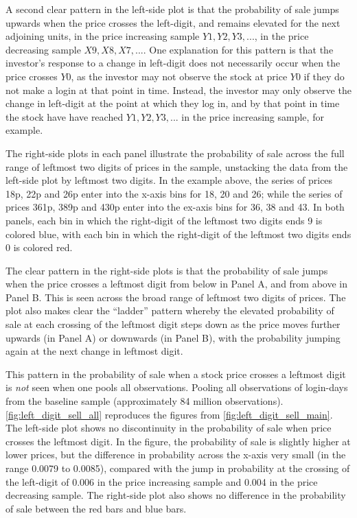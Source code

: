 A second clear pattern in the left-side plot is that the probability of sale jumps upwards when the price crosses the left-digit, and remains elevated for the next adjoining units, in the price increasing sample $Y1, Y2, Y3, ...$, in the price decreasing sample $X9, X8, X7,...$. One explanation for this pattern is that the investor's response to a change in left-digit does not necessarily occur when the price crosses $Y0$, as the investor may not observe the stock at price $Y0$ if they do not make a login at that point in time. Instead, the investor may only observe the change in left-digit at the point at which they log in, and by that point in time the stock have have reached $Y1, Y2, Y3,...$ in the price increasing sample, for example.

The right-side plots in each panel illustrate the probability of sale across the full range of leftmost two digits of prices in the sample, unstacking the data from the left-side plot by leftmost two digits. In the example above, the series of prices 18p, 22p and 26p enter into the x-axis bins for 18, 20 and 26; while the series of prices 361p, 389p and 430p enter into the ex-axis bins for 36, 38 and 43. In both panels, each bin in which the right-digit of the leftmost two digits ends 9 is colored blue, with each bin in which the right-digit of the leftmost two digits ends 0 is colored red.

The clear pattern in the right-side plots is that the probability of sale jumps when the price crosses a leftmost digit from below in Panel A, and from above in Panel B. This is seen across the broad range of leftmost two digits of prices. The plot also makes clear the ``ladder'' pattern whereby the elevated probability of sale at each crossing of the leftmost digit steps down as the price moves further upwards (in Panel A) or downwards (in Panel B), with the probability jumping again at the next change in leftmost digit.

This pattern in the probability of sale when a stock price crosses a leftmost digit is \textit{not} seen when one pools all observations. Pooling all observations of login-days from the baseline sample (approximately 84 million observations). \ref{fig:left_digit_sell_all} reproduces the figures from \ref{fig:left_digit_sell_main}. The left-side plot shows no discontinuity in the probability of sale when price crosses the leftmost digit. In the figure, the probability of sale is slightly higher at lower prices, but the difference in probability across the x-axis very small (in the range 0.0079 to 0.0085), compared with the jump in probability at the crossing of the left-digit of 0.006 in the price increasing sample and 0.004 in the price decreasing sample. The right-side plot also shows no difference in the probability of sale between the red bars and blue bars.

